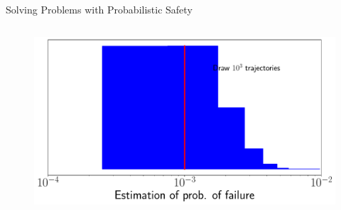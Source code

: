 \documentclass[lecture]{beamer}
\begin{document}
\begin{frame}{\normalsize Solving Problems with Probabilistic Safety}
\begin{columns}[t]
\begin{overlayarea}{\textwidth}{0.6\textheight}
\begin{figure}
{	\includegraphics[width=1\textwidth,clip]{Codes/BasicsSafety/SafetyEstimation3_3.pdf}
	}
	\end{figure}
\end{overlayarea}

\end{columns}

\end{frame}
\end{document}
